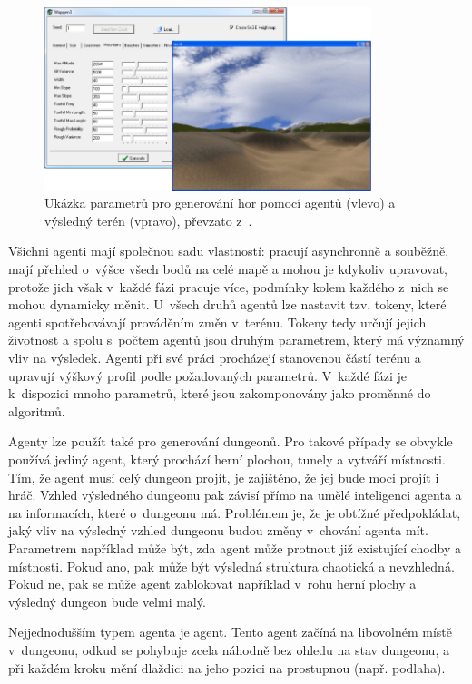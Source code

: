 \begin{figure}[hbt]
    \centering
    \includegraphics[width=0.85\textwidth]{obrazky/agent_terrain.png}
    \caption{Ukázka parametrů pro generování hor pomocí agentů (vlevo) a výsledný terén (vpravo), převzato z~\cite{lit:agent_terrain}.}
    \label{img:agent_terrain}
\end{figure}
\par
Všichni agenti mají společnou sadu vlastností: pracují asynchronně a souběžně, mají přehled o~výšce všech bodů na celé mapě a mohou je kdykoliv upravovat, protože jich však v~každé fázi pracuje více, podmínky kolem každého z~nich se mohou dynamicky měnit.
U~všech druhů agentů lze nastavit tzv. tokeny, které agenti spotřebovávají prováděním změn v~terénu.
Tokeny tedy určují jejich životnost a spolu s~počtem agentů jsou druhým parametrem, který má významný vliv na výsledek.
Agenti při své práci procházejí stanovenou částí terénu a upravují výškový profil podle požadovaných parametrů.
V~každé fázi je k~dispozici mnoho parametrů, které jsou zakomponovány jako proměnné do algoritmů.
\par
Agenty lze použít také pro generování dungeonů.
Pro takové případy se obvykle používá jediný agent, který prochází herní plochou,  tunely a vytváří místnosti.
Tím, že agent musí celý dungeon projít, je zajištěno, že jej bude moci projít i hráč.
Vzhled výsledného dungeonu pak závisí přímo na umělé inteligenci agenta a na informacích, které o~dungeonu má.
Problémem je, že je obtížné předpokládat, jaký vliv na výsledný vzhled dungeonu budou změny v~chování agenta mít.
Parametrem například může být, zda agent může protnout již existující chodby a místnosti.
Pokud ano, pak může být výsledná struktura chaotická a nevzhledná.
Pokud ne, pak se může agent zablokovat například v~rohu herní plochy a výsledný dungeon bude velmi malý.
\par
Nejjednodušším typem agenta je  agent.
Tento agent začíná na libovolném místě v~dungeonu, odkud se pohybuje zcela náhodně bez ohledu na stav dungeonu, a při každém kroku mění dlaždici na jeho pozici na prostupnou (např. podlaha).
